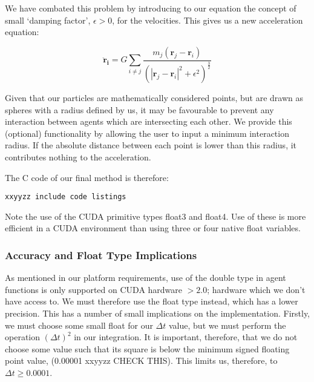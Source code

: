 \documentclass[11pt,a4paper]{article}
\begin{document}
We have combated this problem by introducing to our equation the concept of small `damping factor', $\epsilon >0$, for the velocities\cite{gems}. This gives us a new acceleration equation:
\begin{center}
\begin{equation}
\mathbf{\ddot r_{i}}=G\sum_{i\neq j}\frac{m_{j}(\mathbf r_{j}-\mathbf r_{i})}{(|\mathbf r_{j}-\mathbf r_{i}|^2+\epsilon^2)^\frac{3}{2}}
\end{equation}
\end{center}

\noindent Given that our particles are mathematically considered points, but are drawn as spheres with a radius defined by us, it may be favourable to prevent any interaction between agents which are intersecting each other. We provide this (optional) functionality by allowing the user to input a minimum interaction radius. If the absolute distance between each point is lower than this radius, it contributes nothing to the acceleration.

The C code of our final method is therefore:
\begin{lstlisting}
xxyyzz include code listings
\end{lstlisting}

\noindent Note the use of the CUDA primitive types float3 and float4. Use of these is more efficient in a CUDA environment than using three or four native float variables.\cite{xxyyzz}

\subsubsection{Accuracy and Float Type Implications}
As mentioned in our platform requirements, use of the double type in agent functions is only supported on CUDA hardware $>2.0$; hardware which we don't have access to. We must therefore use the float type instead, which has a lower precision. This has a number of small implications on the implementation. Firstly, we must choose some small float for our $\Delta t$ value, but we must perform the operation $(\Delta t)^2$ in our integration. It is important, therefore, that we do not choose some value such that its square is below the minimum signed floating point value, (0.00001 xxyyzz CHECK THIS). This limits us, therefore, to $\Delta t\ge0.0001$. 
\end{document}
